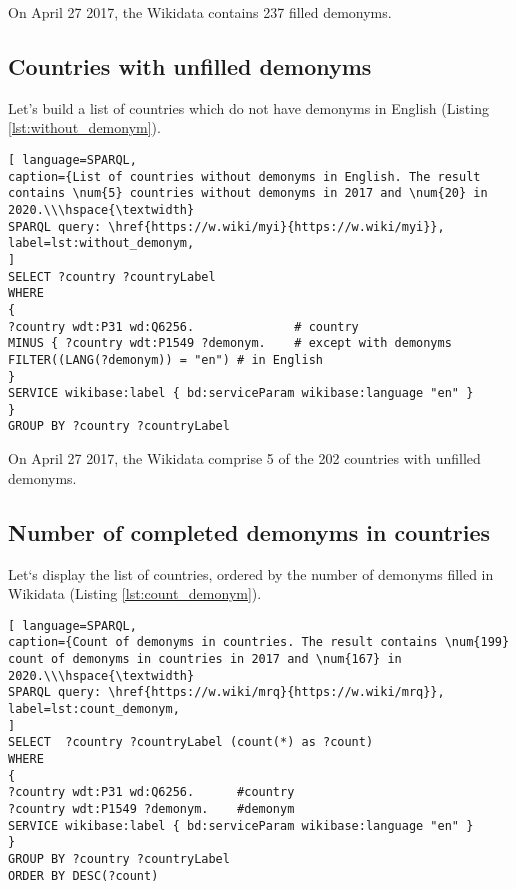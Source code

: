 
On April 27 2017, the Wikidata contains 237 filled demonyms.

\subsection{Countries with unfilled demonyms}

Let's build a list of countries which do not have demonyms in English (Listing \ref{lst:without_demonym}).

\begin{lstlisting}[ language=SPARQL, 
caption={List of countries without demonyms in English. The result contains \num{5} countries without demonyms in 2017 and \num{20} in 2020.\\\hspace{\textwidth}
SPARQL query: \href{https://w.wiki/myi}{https://w.wiki/myi}},
label=lst:without_demonym, 
]
SELECT ?country ?countryLabel 
WHERE
{
?country wdt:P31 wd:Q6256.              # country
MINUS { ?country wdt:P1549 ?demonym.    # except with demonyms
FILTER((LANG(?demonym)) = "en") # in English
}    
SERVICE wikibase:label { bd:serviceParam wikibase:language "en" }
}
GROUP BY ?country ?countryLabel
\end{lstlisting}


On April 27 2017, the Wikidata comprise 5 of the 202 countries with unfilled demonyms.

\subsection{Number of completed demonyms in countries}

Let`s display the list of countries, ordered by the number of demonyms filled in Wikidata (Listing \ref{lst:count_demonym}).

\begin{lstlisting}[ language=SPARQL, 
caption={Count of demonyms in countries. The result contains \num{199} count of demonyms in countries in 2017 and \num{167} in 2020.\\\hspace{\textwidth}
SPARQL query: \href{https://w.wiki/mrq}{https://w.wiki/mrq}},
label=lst:count_demonym, 
]
SELECT  ?country ?countryLabel (count(*) as ?count)
WHERE
{
?country wdt:P31 wd:Q6256.      #country
?country wdt:P1549 ?demonym.    #demonym
SERVICE wikibase:label { bd:serviceParam wikibase:language "en" }
}
GROUP BY ?country ?countryLabel 
ORDER BY DESC(?count)
\end{lstlisting}

